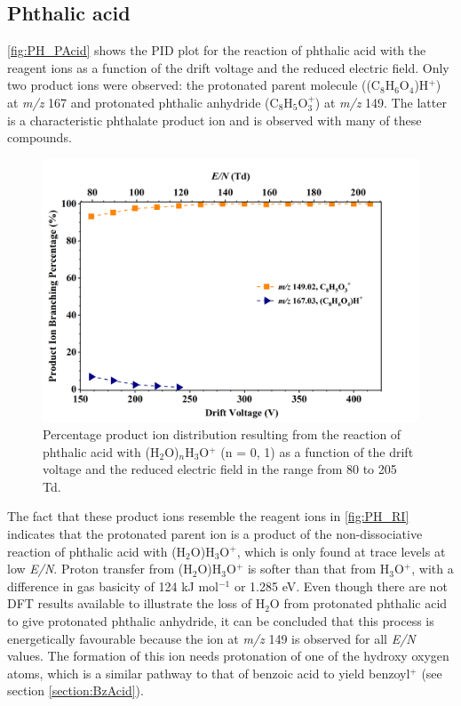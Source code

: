\subsection{Phthalic acid}



\autoref{fig:PH_PAcid} shows the PID plot for the reaction of phthalic acid with the reagent ions as a function of the drift voltage and the reduced electric field. 
%
Only two product ions were observed: the protonated parent molecule  ((C$_8$H$_6$O$_4$)H$^+$)  at \textit{m/z} 167 and  protonated phthalic anhydride (C$_8$H$_{5}$O$_3^+$) at \textit{m/z} 149.
%
The latter is a characteristic phthalate product ion and is observed with many of these compounds.

    \begin{figure}[htb]
    \centering
    \includegraphics[height=0.4\textheight]{pics/Pacid-BR.png}
    \caption{Percentage product ion distribution resulting from the reaction of phthalic acid with (H$_2$O)$_n$H$_3$O$^+$ (n = 0, 1) as a function of the drift voltage and the reduced electric field in the range from 80 to 205 Td.}
    \label{fig:PH_PAcid}
    \end{figure}


The fact that these product ions resemble the reagent ions in \autoref{fig:PH_RI} indicates that the protonated parent ion is a product of the non-dissociative reaction of phthalic acid with (H$_2$O)H$_3$O$^+$, which is only found at trace levels at low \textit{E/N}.
%
Proton transfer from (H$_2$O)H$_3$O$^+$ is  softer  than that from H$_3$O$^+$, with a difference in gas basicity  of 124 kJ mol$^{-1}$ or 1.285 eV.
%
Even though there are not DFT results available to illustrate the loss of H$_2$O from protonated phthalic acid to give protonated phthalic anhydride, it can be concluded that this process is energetically favourable because the ion at \textit{m/z} 149 is observed for all \textit{E/N} values. 
%
The formation of this ion needs  protonation of one of the hydroxy oxygen atoms, which is a similar pathway to that of benzoic acid to yield benzoyl$^+$ (see section \ref{section:BzAcid}). %









